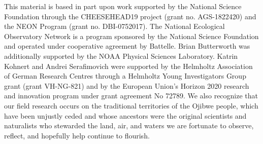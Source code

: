 \documentclass[draft]{agujournal2019}
\begin{document}
\acknowledgments
This material is based in part upon work supported by the National Science Foundation through the CHEESEHEAD19 project (grant no. AGS-1822420) and the NEON Program (grant no. DBI-0752017). The National Ecological Observatory Network is a program sponsored by the National Science Foundation and operated under cooperative agreement by Battelle. Brian Butterworth was additionally supported by the NOAA Physical Sciences Laboratory. Katrin Kohnert and Andrei Serafimovich were supported by the Helmholtz Association of German Research Centres through a Helmholtz Young Investigators Group grant (grant VH-NG-821) and by the European Union's Horizon 2020 research and innovation program under grant agreement No 72789. We also recognize that our field research occurs on the traditional territories of the Ojibwe people, which have been unjustly ceded and whose ancestors were the original scientists and naturalists who stewarded the land, air, and waters we are fortunate to observe, reflect, and hopefully help continue to flourish.



%
%







%
%
%
%
%
\end{document}
